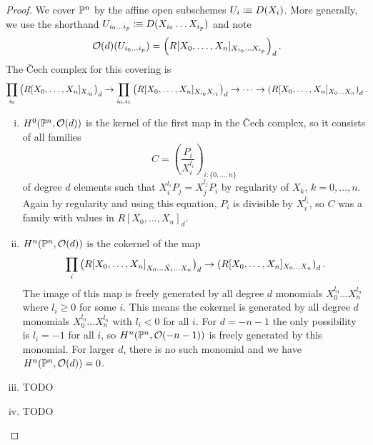 \begin{proof}
  We cover $\mathbb{P}^n$ by the affine open subschemes $U_i\vcentcolon\mspace{-1.2mu}\equiv D(X_i)$.
  More generally, we use the shorthand $U_{i_0\dots i_p}\vcentcolon\mspace{-1.2mu}\equiv D(X_{i_0}\dots X_{i_p})$
  and note
  \[
    \mathcal O(d)(U_{i_0\dots i_p})=\left(R[X_0,\dots,X_n]_{X_{i_0}\dots X_{i_p}}\right)_d
    \rlap{.}
  \]
  The \v{C}ech complex for this covering is
  \[
    \prod_{i_0}\left(R[X_0,\dots,X_n]_{X_{i_0}}\right)_d \to \prod_{i_0,i_1} \left(R[X_0,\dots,X_n]_{X_{i_0} X_{i_1}}\right)_d \to \dots \to \left(R[X_0,\dots,X_n]_{X_0\dots X_n}\right)_d
    \rlap{.}
  \]
  \begin{enumerate}[(i)]
  \item $H^0(\mathbb{P}^n,\mathcal O(d))$ is the kernel of the first map in the \v{C}ech complex,
    so it consists of all families
    \[
      C=\left(\frac{P_i}{X_{i}^{l_i}}\right)_{i:\{0,\dots,n\}}
    \]
    of degree $d$ elements such that $X_i^{l_i}P_j=X_j^{l_j}P_i$ by regularity of $X_k$, $k=0,\dots,n$.
    Again by regularity and using this equation, $P_i$ is divisible by $X_i^{l_i}$, so $C$ was a family with values in $R[X_0,\dots,X_n]_d$.
  \item $H^n(\mathbb{P}^n,\mathcal O(d))$ is the cokernel of the map
    \[
      \prod_{i} \left(R[X_0,\dots,X_n]_{X_0\dots \hat{X_i}\dots X_n}\right)_d \to \left(R[X_0,\dots,X_n]_{X_0\dots X_n}\right)_d
      \rlap{.}
    \]
    The image of this map is freely generated by all degree $d$ monomials $X_0^{l_0}\dots X_n^{l_n}$ where $l_i\geq 0$ for some $i$.
    This means the cokernel is generated by all degree $d$ monomials $X_0^{l_0}\dots X_n^{l_n}$ with $l_i<0$ for all $i$.
    For $d= -n-1$ the only possibility is $l_i=-1$ for all $i$, so $H^n(\mathbb{P}^n,\mathcal O(-n-1))$ is freely generated by this monomial.
    For larger $d$, there is no such monomial and we have $H^n(\mathbb{P}^n,\mathcal O(d))=0$.
  \item TODO
  \item TODO
  \end{enumerate}
\end{proof}